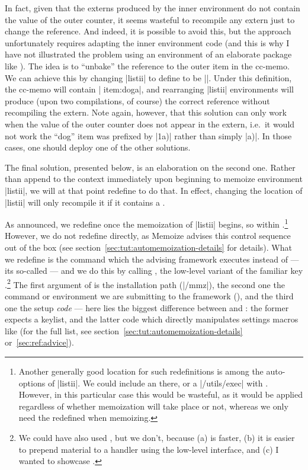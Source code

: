 \documentclass[a4paper,11pt]{article}
\def\exampledir{examples/}
\begin{document}
In fact, given that the externs produced by the inner environment do not
contain the value of the outer counter, it seems wasteful to recompile any
extern just to change the reference.  And indeed, it is possible to avoid this,
but the approach unfortunately requires adapting the inner environment code
(and this is why I have not illustrated the problem using an environment of an
elaborate package like ).  The idea is to ``unbake'' the
reference to the outer item in the cc-memo.  We can achieve this by changing
|listii| to define  to be |\unexpanded{\thecounti}\thecountii|.
Under this definition, the cc-memo will contain |\mmzLabel
{item:dog}{\thecounti a}|, and rearranging |listii| environments will produce
(upon two compilations, of course) the correct reference without recompiling
the extern.  Note again, however, that this solution can only work when the
value of the outer counter does not appear in the extern, i.e.\ it would not
work the ``dog'' item was prefixed by |1a)| rather than simply |a)|.  In those
cases, one should deploy one of the other solutions.%
\attachexample[label+listii.tex][\exampledir label+.tex.c5.attachment]

The final solution, presented below, is an elaboration on the second one.
Rather than append  to the context immediately upon beginning
to memoize environment |listii|, we will at that point redefine  to do
that.  In effect, changing the location of |listii| will only recompile it if
it contains a .

As announced, we redefine  once the memoization of |listii| begins,
so within .\footnote{Another generally good
  location for such redefinitions is among the auto-options of |listii|.  We
  could include an  there, or a |/utils/exec|
  with .  However, in this particular case this would be
  wasteful, as it would be applied regardless of whether memoization will take
  place or not, whereas we only need the redefined  when memoizing.}
However, we do not redefine  directly, as Memoize advises this
control sequence out of the box (see
section~\ref{sec:tut:automemoization-details} for details).  What we redefine
is the command which the advising framework executes instead of  ---
its so-called  --- and we do this by calling
, the low-level variant of the familiar key
.\footnote{We could have also used , but we don't,
  because (a)  is faster, (b) it is easier to prepend
  material to a handler using the low-level interface, and (c) I wanted to
  showcase .}  The first argument of 
is the installation path (|/mmz|), the second one the command or environment we
are submitting to the framework (), and the third one the setup
\emph{code} --- here lies the biggest difference between  and
: the former expects a keylist, and the latter 
code which directly manipulates settings macros like
 (for the full list, see
section~\ref{sec:tut:automemoization-details} or~\ref{sec:ref:advice}).
\end{document}
